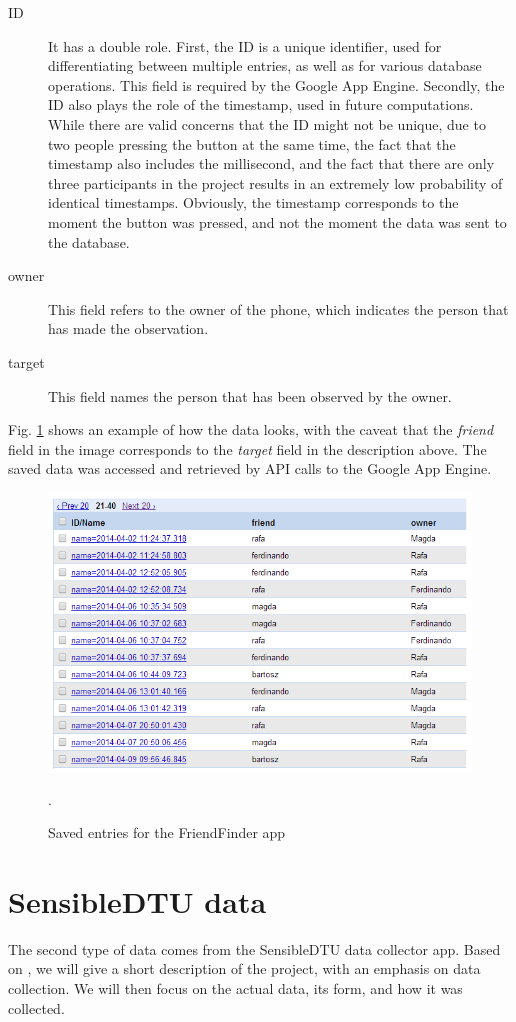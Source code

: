 \begin{description}
  \item[ID] It has a double role. First, the ID is a unique identifier, used for differentiating between multiple entries, as well as for various database operations. This field is required by the Google App Engine. Secondly, the ID also plays the role of the timestamp, used in future computations. While there are valid concerns that the ID might not be unique, due to two people pressing the button at the same time, the fact that the timestamp also includes the millisecond, and the fact that there are only three participants in the project results in an extremely low probability of identical timestamps. Obviously, the timestamp corresponds to the moment the button was pressed, and not the moment the data was sent to the database.  
  \item[owner] This field refers to the owner of the phone, which indicates the person that has made the observation.
  \item[target] This field names the person that has been observed by the owner.
\end{description}

Fig. \ref{pic:dataviewer} shows an example of how the data looks, with the caveat that the \textit{friend} field in the image corresponds to the \textit{target} field in the description above. The saved data was accessed and retrieved by API calls to the Google App Engine.  

\begin{figure}[h]
	\begin{center}
		\includegraphics[scale=0.8]{figures/datastore.png}
	\end{center}
	
	\caption{Saved entries for the FriendFinder app}.
	\label{pic:dataviewer}

\end{figure}


\section{SensibleDTU data}

 The second type of data comes from the SensibleDTU data collector app. Based on \cite{Stopczynski}, we will give a short description of the project, with an emphasis on data collection. We will then focus on the actual data, its form, and how it was collected.	